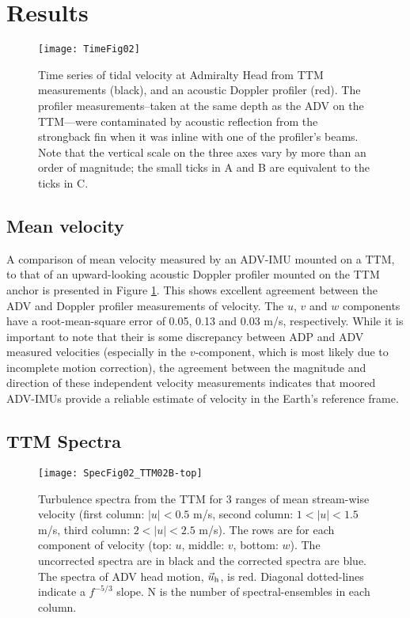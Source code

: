 \section{Results}

\begin{figure}[t]
  \centering
  \texttt{[image: TimeFig02]}
  \caption{Time series of tidal velocity at Admiralty Head from TTM measurements (black), and an acoustic Doppler profiler (red). The profiler measurements--taken at the same depth as the ADV on the TTM---were contaminated by acoustic reflection from the strongback fin when it was inline with one of the profiler's beams. Note that the vertical scale on the three axes vary by more than an order of magnitude; the small ticks in A and B are equivalent to the ticks in C.}
  \label{fig:vel_time}
\end{figure}

\subsection{Mean velocity}

A comparison of mean velocity measured by an ADV-IMU mounted on a TTM, to that of an upward-looking acoustic Doppler profiler mounted on the TTM anchor is presented in Figure \ref{fig:vel_time}. This shows excellent agreement between the ADV and Doppler profiler measurements of velocity. The $u$, $v$ and $w$ components have a root-mean-square error of 0.05, 0.13 and 0.03 m/s, respectively. While it is important to note that their is some discrepancy between ADP and ADV measured velocities (especially in the $v$-component, which is most likely due to incomplete motion correction), the agreement between the magnitude and direction of these independent velocity measurements indicates that moored ADV-IMUs provide a reliable estimate of velocity in the Earth's reference frame.

\subsection{TTM Spectra}

\begin{figure*}[t]
  \centering
  \texttt{[image: SpecFig02\_TTM02B-top]}
  \caption{Turbulence spectra from the TTM for 3 ranges of mean stream-wise velocity (first column: $|u|< 0.5$ m/s, second column: $1 < |u| < 1.5$ m/s, third column: $2 < |u| < 2.5$ m/s). The rows are for each component of velocity (top: $u$, middle: $v$, bottom: $w$). The uncorrected spectra are in black and the corrected spectra are blue. The spectra of ADV head motion, $\vec{u}_\mathrm{h}$, is red. Diagonal dotted-lines indicate a $f^{-5/3}$ slope. N is the number of spectral-ensembles in each column.}
  \label{fig:spec:ttm}
\end{figure*}

